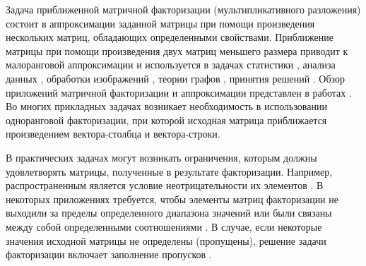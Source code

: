 \documentclass[specialist,
               substylefile = spbu.rtx,
               subf,href,colorlinks=true, 12pt]{disser}
\theoremstyle{definition}
\begin{document}
%
%
\date{\number\year}

\maketitle[en]


\tableofcontents

\intro
Задача приближенной матричной факторизации (мультипликативного разложения) состоит в аппроксимации заданной матрицы при помощи произведения нескольких матриц, обладающих определенными свойствами. Приближение матрицы при помощи произведения двух матриц меньшего размера приводит к малоранговой аппроксимации и используется в задачах статистики \cite{Aissaelbey2016Sparse, Golub1980Analysis}, анализа данных \cite{Abdollahi2017Using, Kannan2013Bounded}, обработки изображений \cite{Xiu2015Rankone}, теории графов \cite{Belachew2017Solving}, принятия решений \cite{Saaty1993Prinyatie, Artamonov2016Group, Krivulin2015Rating, Krivulin2016Using}. Обзор приложений матричной факторизации и аппроксимации представлен в работах \cite{Gillis2017Introduction, Kumar2017Literature, Elden2007Matrix, Markovsky2012Low}.
Во многих прикладных задачах \cite{Golub1980Analysis,Belachew2017Solving,Aissaelbey2016Sparse,Ma2018Gradient,Xiu2015Rankone,Saaty1993Prinyatie,Artamonov2016Group, Krivulin2015Rating, Krivulin2016Using} возникает необходимость в использовании одноранговой факторизации, при которой исходная матрица приближается произведением вектора-столбца и вектора-строки.

В практических задачах могут возникать ограничения, которым должны удовлетворять матрицы, полученные в результате факторизации. Например, распространенным является условие неотрицательности их элементов \cite{Abdollahi2017Using, Hofmann1999Probabilistic, Berry2009Document, Gillis2017Introduction, Belachew2017Solving}. 
В некоторых приложениях требуется, чтобы элементы матриц факторизации не выходили за пределы определенного диапазона значений \cite{Kannan2013Bounded} 
или были связаны между собой определенными соотношениями \cite{Krivulin2015Rating, Krivulin2016Using}.  
В случае, если некоторые значения исходной матрицы не определены (пропущены), решение задачи факторизации включает заполнение пропусков  \cite{Shi2017Rankone,Markovsky2013Structured}.
\end{document}
